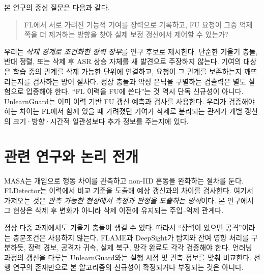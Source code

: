 \documentclass[10pt,a4paper]{article}
\begin{document}
본 연구의 중심 질문은 다음과 같다.
\begin{quote}
FL에서 서로 가려진 기능적 기여를 장력으로 기록하고,
FU 요청이 그중 억제 쪽을 더 제거하는 방향을 찾아 실제 보정 갱신에서 제어할 수 있는가?
\end{quote}
우리는 \emph{삭제 경계로 조건화한 장력 장부}를 연구 후보로 제시한다.
단순한 기울기 충돌, 반대 정렬, 또는 삭제 후 ASR 상승 자체를 새 발견으로 주장하지 않는다.
기여의 대상은 학습 중의 관계를 삭제 가능한 단위에 연결하고,
요청이 그 관계를 보존하는지 깨뜨리는지를 검사하는 방어 절차다.
정상 충돌과 악성 은닉을 구별하는 검출력은 별도 실험으로 입증해야 한다.
``FL 이력을 FU에 쓴다''는 것 역시 단독 신규성이 아니다.
UnlearnGuard는 이미 이력 기반 FU 갱신 예측과 검사를 사용한다\cite{unlearnguard}.
우리가 검증해야 하는 차이는 FL에서 함께 있을 때 가려졌던 기여가 삭제로 분리되는 관계가
개별 갱신의 크기·방향·시간적 일관성보다 추가 정보를 주는지에 있다.

\section{관련 연구와 논리 전개}
MASA는 개입으로 행동 차이를 관측하고 non-IID 혼동을 완화하는 절차를 둔다\cite{masa}.
FLDetector는 이력에서 비교 기준을 도출해 예상 갱신과의 차이를 검사한다\cite{fldetector}.
여기서 가져오는 것은 \emph{관측 가능한 현상에서 측정과 판정을 도출하는 방식}이다.
본 연구에서 그 현상은 삭제 후 변화가 아니라 삭제 이전에 유지되는 주입--억제 관계다.

정상 다중 과제에서도 기울기 충돌이 생길 수 있다\cite{pcgrad}.
따라서 ``장력이 있으면 공격''이라는 충분조건은 사용하지 않는다.
FLAME과 DeepSight가 탐지와 잔여 영향 처리를 구분하듯\cite{flame,deepsight},
장력 경보, 공격자 귀속, 실제 복구, 망각 완료도 각각 검증해야 한다.
언러닝 과정의 갱신을 다루는 UnlearnGuard\cite{unlearnguard}와는 실행 시점 및 관측 정보를 맞춰 비교한다.
선행 연구의 존재만으로 본 알고리즘의 신규성이 확정되거나 부정되는 것은 아니다.
\end{document}
